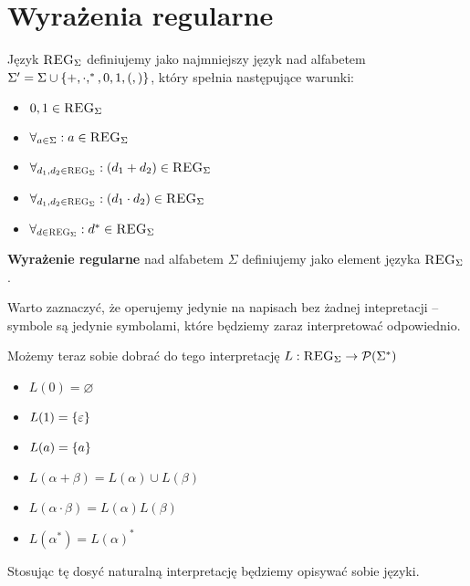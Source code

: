 \section{Wyrażenia regularne} 

\begin{definition}
    Język \( \textsc{REG}_\Sigma \) definiujemy jako najmniejszy język nad alfabetem \( \Sigma' = \Sigma \cup \set{+, \cdot, ^*, 0, 1, (, )} \), który spełnia następujące warunki:
    
       \begin{itemize}
        \item \( 0, 1 \in \textsc{REG}_\Sigma \)
        \item \( \forall_{a \in \Sigma}: a \in \textsc{REG}_\Sigma \)
        \item \( \forall_{d_1, d_2 \in \textsc{REG}_\Sigma}: (d_1 + d_2) \in \textsc{REG}_\Sigma \)
        \item \( \forall_{d_1, d_2 \in \textsc{REG}_\Sigma}: (d_1 \cdot d_2) \in \textsc{REG}_\Sigma \)
        \item \( \forall_{d \in \textsc{REG}_\Sigma}: d^* \in \textsc{REG}_\Sigma \)
    \end{itemize}
\end{definition}

\begin{definition}
    \textbf{Wyrażenie regularne} nad alfabetem \( \Sigma \) definiujemy jako element języka  \( \textsc{REG}_\Sigma \).
    
\end{definition}

Warto zaznaczyć, że operujemy jedynie na napisach bez żadnej intepretacji -- symbole są jedynie symbolami, które będziemy zaraz interpretować odpowiednio.

Możemy teraz sobie dobrać do tego interpretację \( L: \reg{\Sigma} \rightarrow \powerset\pars{\Sigma^*} \)
\begin{itemize}
    \item \( L(0) = \varnothing \)
    \item \( L(1) = \set{\eps} \)
    \item \( L(a) = \set{a} \)
    \item \( L(\alpha + \beta) = L(\alpha) \cup L(\beta) \)
    \item \( L(\alpha \cdot \beta) = L(\alpha)L(\beta) \)
    \item \( L(\alpha^*) = L(\alpha)^* \)
\end{itemize}

Stosując tę dosyć naturalną interpretację będziemy opisywać sobie języki.

